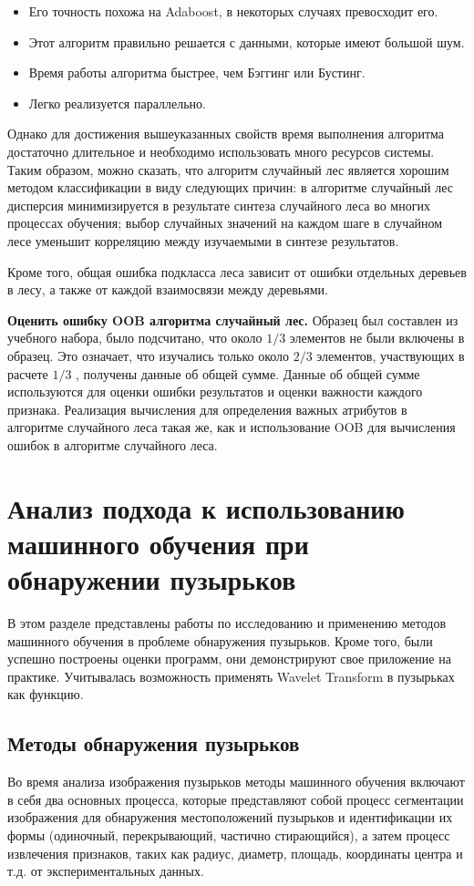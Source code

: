 \documentclass[a4paper,14pt]{extreport}
\begin{document}
\begin{itemize}
	\item Его точность похожа на Adaboost, в некоторых случаях превосходит его. 
\item Этот алгоритм правильно решается с данными, которые имеют большой шум. 
\item Время работы алгоритма быстрее, чем Бэггинг или Бустинг. 
\item Легко реализуется параллельно.
\end{itemize}

Однако для достижения вышеуказанных свойств время выполнения алгоритма достаточно длительное и необходимо использовать много ресурсов системы. Таким образом, можно сказать, что алгоритм случайный лес является хорошим методом классификации в виду следующих причин: в алгоритме случайный лес дисперсия минимизируется в результате синтеза случайного леса во многих процессах обучения; выбор случайных значений на каждом шаге в случайном лесе уменьшит корреляцию между изучаемыми в синтезе результатов.

Кроме того, общая ошибка подкласса леса зависит от ошибки отдельных деревьев в лесу, а также от каждой взаимосвязи между деревьями.

\textbf{Оценить ошибку OOB алгоритма случайный лес.} Образец был составлен из учебного набора, было подсчитано, что около $1/3$ элементов не были включены в образец. Это означает, что изучались только около $2/3$ элементов, участвующих в расчете $1/3$ , получены данные об общей сумме. Данные об общей сумме используются для оценки ошибки результатов и оценки важности каждого признака. Реализация вычисления для определения важных атрибутов в алгоритме случайного леса такая же, как и использование OOB для вычисления ошибок в алгоритме случайного леса. 

\section{Анализ подхода к использованию машинного обучения при обнаружении пузырьков}
В этом разделе представлены работы по исследованию и применению методов машинного обучения в проблеме обнаружения пузырьков. Кроме того, были успешно построены оценки программ, они демонстрируют свое приложение на практике. Учитывалась возможность применять Wavelet Transform в пузырьках как функцию.
\subsection{Методы обнаружения пузырьков}
Во время анализа изображения пузырьков методы машинного обучения включают в себя два основных процесса, которые представляют собой процесс сегментации изображения для обнаружения местоположений пузырьков и идентификации их формы (одиночный, перекрывающий, частично стирающийся), а затем процесс извлечения признаков, таких как радиус, диаметр, площадь, координаты центра и т.д. от экспериментальных данных.
\end{document}
